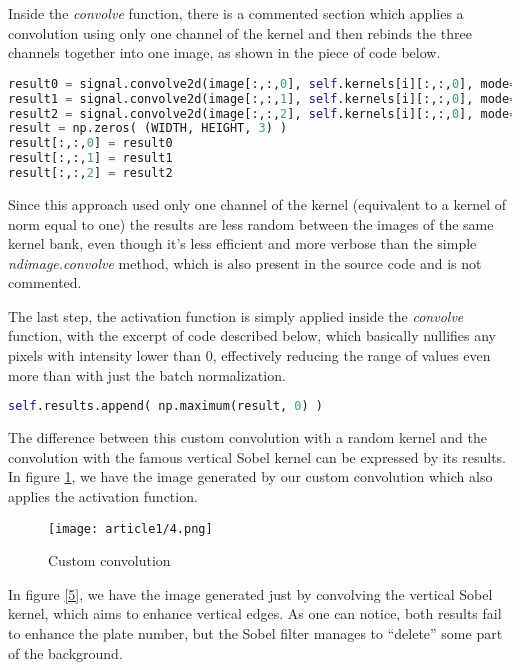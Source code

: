 \documentclass[11pt]{IEEEtran}
\begin{document}
Inside the \textit{convolve} function, there is a commented section which applies a convolution using only one channel of the kernel and then rebinds the three channels together into one image, as shown in the piece of code below.

\begin{lstlisting}[language=Python]
result0 = signal.convolve2d(image[:,:,0], self.kernels[i][:,:,0], mode='same')
result1 = signal.convolve2d(image[:,:,1], self.kernels[i][:,:,0], mode='same')
result2 = signal.convolve2d(image[:,:,2], self.kernels[i][:,:,0], mode='same')
result = np.zeros( (WIDTH, HEIGHT, 3) )
result[:,:,0] = result0
result[:,:,1] = result1
result[:,:,2] = result2
\end{lstlisting}

Since this approach used only one channel of the kernel (equivalent to a kernel of norm equal to one) the results are less random between the images of the same kernel bank, even though it's less efficient and more verbose than the simple \textit{ndimage.convolve} method, which is also present in the source code and is not commented.

The last step, the activation function is simply applied inside the \textit{convolve} function, with the excerpt of code described below, which basically nullifies any pixels with intensity lower than 0, effectively reducing the range of values even more than with just the batch normalization.

\begin{lstlisting}[language=Python]
self.results.append( np.maximum(result, 0) )
\end{lstlisting}

The difference between this custom convolution with a random kernel and the convolution with the famous vertical Sobel kernel can be expressed by its results. In figure \ref{4}, we have the image generated by our custom convolution which also applies the activation function.

\begin{figure}[h!]
    \centering
    \texttt{[image: article1/4.png]}
    \caption{Custom convolution}
    \label{4}
\end{figure}

In figure \ref{5}, we have the image generated just by convolving the vertical Sobel kernel, which aims to enhance vertical edges. As one can notice, both results fail to enhance the plate number, but the Sobel filter manages to ``delete'' some part of the background.
\end{document}

